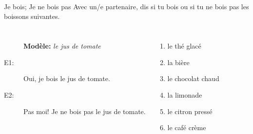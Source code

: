 \documentclass{beamer}
\begin{document}
  \begin{frame}{Je bois; Je ne bois pas}
    Avec un/e partenaire, dis si tu bois ou si tu ne bois pas les boissons suivantes. \\
    \begin{columns}
        \begin{description}
          \item[] \textbf{Modèle:} \emph{le jus de tomate}
          \item[E1:] Oui, je bois le jus de tomate.
          \item[E2:] Pas moi! Je ne bois pas le jus de tomate.
        \end{description}
        \begin{enumerate}
          \item le thé glacé
          \item la bière
          \item le chocolat chaud
          \item la limonade
          \item le citron pressé
          \item le café crème
        \end{enumerate}
    \end{columns}
  \end{frame}
\end{document}
